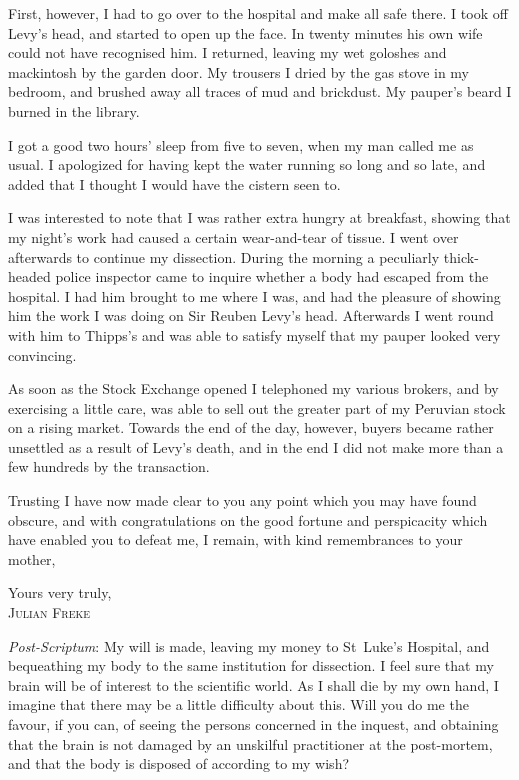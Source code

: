 First, however, I had to go over to the hospital and make all safe there. I took off Levy's head, and started to open up the face. In twenty minutes his own wife could not have recognised him. I returned, leaving my wet goloshes and mackintosh by the garden door. My trousers I dried by the gas stove in my bedroom, and brushed away all traces of mud and brickdust. My pauper's beard I burned in the library.

I got a good two hours' sleep from five to seven, when my man called me as usual. I apologized for having kept the water running so long and so late, and added that I thought I would have the cistern seen to.

I was interested to note that I was rather extra hungry at breakfast, showing that my night's work had caused a certain wear-and-tear of tissue. I went over afterwards to continue my dissection. During the morning a peculiarly thick-headed police inspector came to inquire whether a body had escaped from the hospital. I had him brought to me where I was, and had the pleasure of showing him the work I was doing on Sir Reuben Levy's head. Afterwards I went round with him to Thipps's and was able to satisfy myself that my pauper looked very convincing.

As soon as the Stock Exchange opened I telephoned my various brokers, and by exercising a little care, was able to sell out the greater part of my Peruvian stock on a rising market. Towards the end of the day, however, buyers became rather unsettled as a result of Levy's death, and in the end I did not make more than a few hundreds by the transaction.

Trusting I have now made clear to you any point which you may have found obscure, and with congratulations on the good fortune and perspicacity which have enabled you to defeat me, I remain, with kind remembrances to your mother,

\begin{flushright}
Yours very truly,\\
\textsc{Julian Freke}
\end{flushright}

\textit{Post-Scriptum}: My will is made, leaving my money to St~Luke's Hospital, and bequeathing my body to the same institution for dissection. I feel sure that my brain will be of interest to the scientific world. As I shall die by my own hand, I imagine that there may be a little difficulty about this. Will you do me the favour, if you can, of seeing the persons concerned in the inquest, and obtaining that the brain is not damaged by an unskilful practitioner at the post-mortem, and that the body is disposed of according to my wish?

